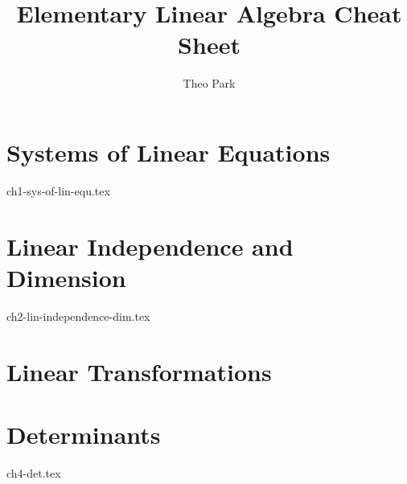\documentclass{report}
\title{Elementary Linear Algebra Cheat Sheet}
\author{Theo Park}
\date{}
\begin{document}
\maketitle

\pagestyle{fancy}


\tableofcontents


\chapter{Systems of Linear Equations}

{ch1-sys-of-lin-equ.tex}


\chapter{Linear Independence and Dimension}

{ch2-lin-independence-dim.tex}


\chapter{Linear Transformations}



\chapter{Determinants}

{ch4-det.tex}
\end{document}
